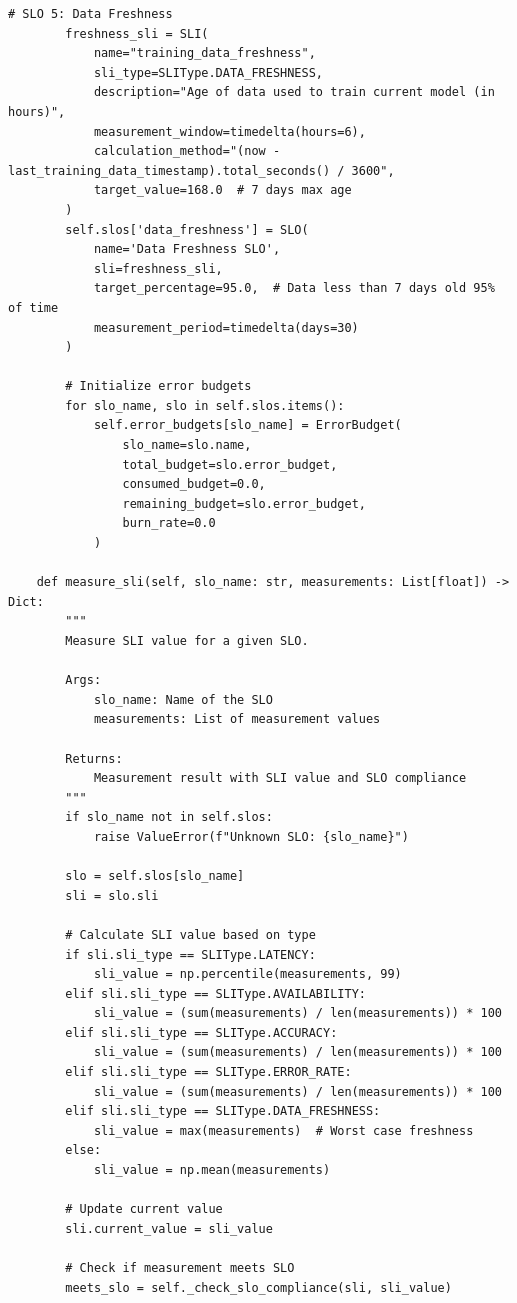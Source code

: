 \begin{lstlisting}[style=python, caption={SLIs and SLOs for ML systems}]
        # SLO 5: Data Freshness
        freshness_sli = SLI(
            name="training_data_freshness",
            sli_type=SLIType.DATA_FRESHNESS,
            description="Age of data used to train current model (in hours)",
            measurement_window=timedelta(hours=6),
            calculation_method="(now - last_training_data_timestamp).total_seconds() / 3600",
            target_value=168.0  # 7 days max age
        )
        self.slos['data_freshness'] = SLO(
            name='Data Freshness SLO',
            sli=freshness_sli,
            target_percentage=95.0,  # Data less than 7 days old 95% of time
            measurement_period=timedelta(days=30)
        )

        # Initialize error budgets
        for slo_name, slo in self.slos.items():
            self.error_budgets[slo_name] = ErrorBudget(
                slo_name=slo.name,
                total_budget=slo.error_budget,
                consumed_budget=0.0,
                remaining_budget=slo.error_budget,
                burn_rate=0.0
            )

    def measure_sli(self, slo_name: str, measurements: List[float]) -> Dict:
        """
        Measure SLI value for a given SLO.

        Args:
            slo_name: Name of the SLO
            measurements: List of measurement values

        Returns:
            Measurement result with SLI value and SLO compliance
        """
        if slo_name not in self.slos:
            raise ValueError(f"Unknown SLO: {slo_name}")

        slo = self.slos[slo_name]
        sli = slo.sli

        # Calculate SLI value based on type
        if sli.sli_type == SLIType.LATENCY:
            sli_value = np.percentile(measurements, 99)
        elif sli.sli_type == SLIType.AVAILABILITY:
            sli_value = (sum(measurements) / len(measurements)) * 100
        elif sli.sli_type == SLIType.ACCURACY:
            sli_value = (sum(measurements) / len(measurements)) * 100
        elif sli.sli_type == SLIType.ERROR_RATE:
            sli_value = (sum(measurements) / len(measurements)) * 100
        elif sli.sli_type == SLIType.DATA_FRESHNESS:
            sli_value = max(measurements)  # Worst case freshness
        else:
            sli_value = np.mean(measurements)

        # Update current value
        sli.current_value = sli_value

        # Check if measurement meets SLO
        meets_slo = self._check_slo_compliance(sli, sli_value)


\end{lstlisting}
